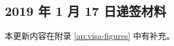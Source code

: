 \documentclass[oneside,final]{book}
\begin{document}

%
\subsection{2019 年 1 月 17 日递签材料}\label{sec:visa-material-17Jan}
本更新内容在附录 \ref{ap:visa-figures} 中有补充。
\end{document}
